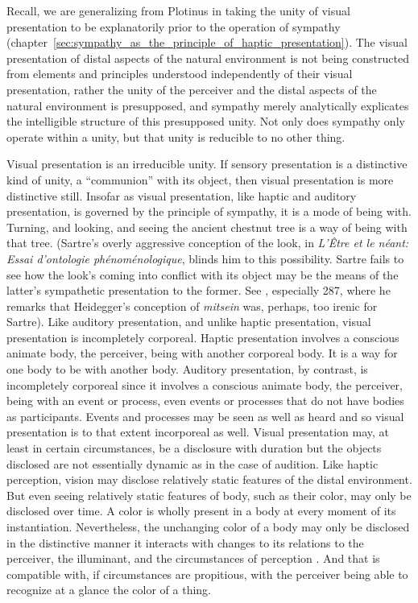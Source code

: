 Recall, we are generalizing from Plotinus in taking the unity of visual presentation to be explanatorily prior to the operation of sympathy (chapter~\ref{sec:sympathy_as_the_principle_of_haptic_presentation}). The visual presentation of distal aspects of the natural environment is not being constructed from elements and principles understood independently of their visual presentation, rather the unity of the perceiver and the distal aspects of the natural environment is presupposed, and sympathy merely analytically explicates the intelligible structure of this presupposed unity. Not only does sympathy only operate within a unity, but that unity is reducible to no other thing.

Visual presentation is an irreducible unity. If sensory presentation is a distinctive kind of unity, a ``communion'' with its object, then visual presentation is more distinctive still. Insofar as visual presentation, like haptic and auditory presentation, is governed by the principle of sympathy, it is a mode of being with. Turning, and looking, and seeing the ancient chestnut tree is a way of being with that tree. (Sartre's overly aggressive conception of the look, in \emph{L'Être et le néant: Essai d'ontologie phénoménologique}, blinds him to this possibility. Sartre fails to see how the look's coming into conflict with its object may be the means of the latter's sympathetic presentation to the former. See \citealt[chapter 5]{Jay:1994aa}, especially 287, where he remarks that Heidegger's conception of \emph{mitsein} was, perhaps, too irenic for Sartre). Like auditory presentation, and unlike haptic presentation, visual presentation is incompletely corporeal. Haptic presentation involves a conscious animate body, the perceiver, being with another corporeal body. It is a way for one body to be with another body. Auditory presentation, by contrast, is incompletely corporeal since it involves a conscious animate body, the perceiver, being with an event or process, even events or processes that do not have bodies as participants. Events and processes may be seen as well as heard and so visual presentation is to that extent incorporeal as well. Visual presentation may, at least in certain circumstances, be a disclosure with duration but the objects disclosed are not essentially dynamic as in the case of audition. Like haptic perception, vision may disclose relatively static features of the distal environment. But even seeing relatively static features of body, such as their color, may only be disclosed over time. A color is wholly present in a body at every moment of its instantiation. Nevertheless, the unchanging color of a body may only be disclosed in the distinctive manner it interacts with changes to its relations to the perceiver, the illuminant, and the circumstances of perception \citep{Broackes:1997pa,Noe:2004fk,Matthen:2005md}. And that is compatible with, if circumstances are propitious, with the perceiver being able to recognize at a glance the color of a thing.

